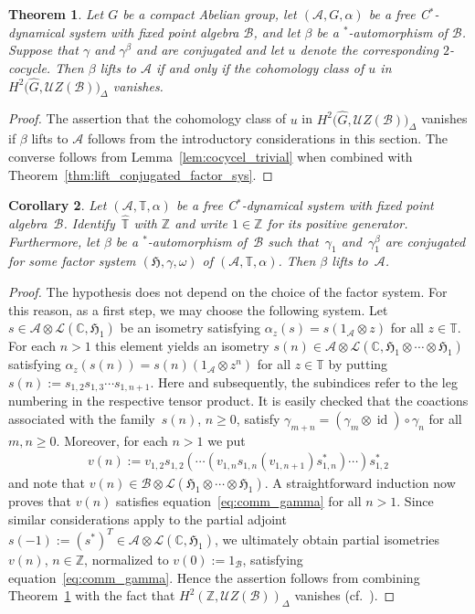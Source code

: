 \documentclass[pdftex]{sigma}
\numberwithin{equation}{section}
\newtheorem{Theorem}{Theorem}[section]
\newtheorem{Corollary}[Theorem]{Corollary}
\newcommand*{\Z}{\mathbb Z}		%
\newcommand*{\C}{\mathbb C}		%
\newcommand*{\tensor}{\otimes}		%
\DeclareMathOperator{\id}{id}		%
\newcommand*{\Star}{$^*$\nobreakdash}
\newcommand*{\hilb}{\mathfrak}		%
\newcommand*{\alg}{\mathcal}		%
\newcommand*{\hH}{\hilb{H}}			%
\newcommand*{\one}{1}				%
\newcommand*{\aA}{\alg{A}}			%
\newcommand*{\aB}{\alg{B}} 			%
\newcommand*{\End}{\mathcal{L}} %
\begin{document}
\begin{Theorem}\label{thm:lift_cohomology}
	Let $G$ be a compact Abelian group, let $(\aA, G, \alpha)$ be a free C\Star-dynamical system with fixed point algebra $\aB$, and let $\beta$ be a \Star-automorphism of $\aB$.
	Suppose that $\gamma$ and $\gamma^\beta$ and are conjugated and let $u$ denote the corresponding $2$-cocycle.
	Then $\beta$ lifts to $\aA$ if and only if the cohomology class of $u$ in $ H^2\big(\hat G,\mathcal{U}Z(\aB)\big)_{\Delta}$ vanishes.
\end{Theorem}
\begin{proof}The assertion that the cohomology class of $u$ in $H^2\big(\hat G,\mathcal{U}Z(\aB)\big)_{\Delta}$ vanishes if $\beta$ lifts to $\aA$ follows from the introductory considerations in this section.
	The converse follows from Lemma~\ref{lem:cocycel_trivial} when combined with Theorem~\ref{thm:lift_conjugated_factor_sys}.
\end{proof}

\begin{Corollary}\label{cor:torus_action}
	Let $(\aA, \mathbb{T}, \alpha)$ be a free C\Star-dynamical system with fixed point algebra~$\aB$.
	Identify~$\hat{\mathbb T}$ with $\Z$ and write $1 \in \Z$ for its positive generator.
	Furthermore, let $\beta$ be a \Star-automorphism of~$\aB$ such that~$\gamma_1$ and~$\gamma_1^\beta$ are conjugated for some factor system $(\hH, \gamma, \omega)$ of $(\aA, \mathbb T, \alpha)$.
	Then $\beta$ lifts to~$\aA$.
\end{Corollary}
\begin{proof}
	The hypothesis does not depend on the choice of the factor system.
	For this reason, as a first step, we may choose the following system.
	Let $s \in \aA \tensor \End(\C,\hH_1)$ be an isometry satisfying $\alpha_z ( s ) = s (\one_{\aA} \tensor z)$ for all $z \in \mathbb T$.
	For each $n > 1$ this element yields an isometry $s(n) \in \aA \tensor \End(\C,\hH_1 \tensor \cdots \tensor \hH_1)$
	satisfying $\alpha_z ( s(n) ) = s(n) (\one_{\aA} \tensor z^n)$ for all $z \in \mathbb T$ by putting $s(n) := s_{1,2} s_{1,3} \cdots s_{1,n+1}$.
	Here and subsequently, the subindices refer to the leg numbering in the respective tensor product.
	It is easily checked that the coactions associated with the family~$s(n)$, $n\geq 0$, satisfy $\gamma_{m+n} = (\gamma_m \tensor \id) \circ \gamma_n$ for all $m,n \geq 0$.
	Moreover, for each $n > 1$ we put
	\begin{gather*}
		v(n) :=
		v_{1,2} s_{1,2} ( \cdots ( v_{1,n} s_{1,n}(v_{1,n+1}) s^*_{1,n} ) \cdots ) s^*_{1,2}
	\end{gather*}
	and note that $v(n) \in \aB \tensor \End(\hH_1 \tensor \cdots \tensor \hH_1)$.
	A straightforward induction now proves that $v(n)$ satisfies
	equation~\eqref{eq:comm_gamma} for all $n > 1$.
	Since similar considerations apply to the partial adjoint $s(-1) := (s^*)^T \in \aA \tensor \End(\C,\hH_1)$,
	we ultimately obtain partial isometries $v(n)$, $n \in \Z$, normalized to $v(0) := \one_\aB$, satisfying equation~\eqref{eq:comm_gamma}.
	Hence the assertion follows from combining Theorem~\ref{thm:lift_cohomology} with the fact that $H^2 (\Z,\mathcal{U}Z(\aB) )_{\Delta}$ vanishes (cf.~\cite[Chapter~VI.6]{Mac95}).
\end{proof}
\end{document}
